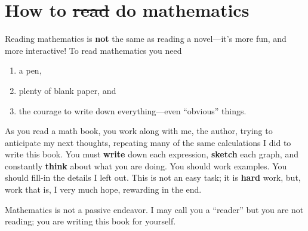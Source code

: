 \documentclass[justified]{tufte-book}
\begin{document}
\tableofcontents











\chapter*{How to \sout{read} do mathematics}

Reading mathematics is \textbf{not} the same as reading a novel---it's
more fun, and more interactive!  To read mathematics you need
\begin{enumerate}
\item a pen,
\item plenty of blank paper, and
\item the courage to write down everything---even ``obvious'' things.
\end{enumerate}
As you read a math book, you work along with me, the author, trying to
anticipate my next thoughts, repeating many of the same calculations I
did to write this book.  You must \textbf{write} down each expression,
\textbf{sketch} each graph, and constantly \textbf{think} about what
you are doing.  You should work examples.  You should fill-in the
details I left out.  This is not an easy task; it is \textbf{hard}
work, but, work that is, I very much hope, rewarding in the end.

Mathematics is not a passive endeavor.  I may call you a ``reader''
but you are not reading; you are writing this book for yourself.
\end{document}
